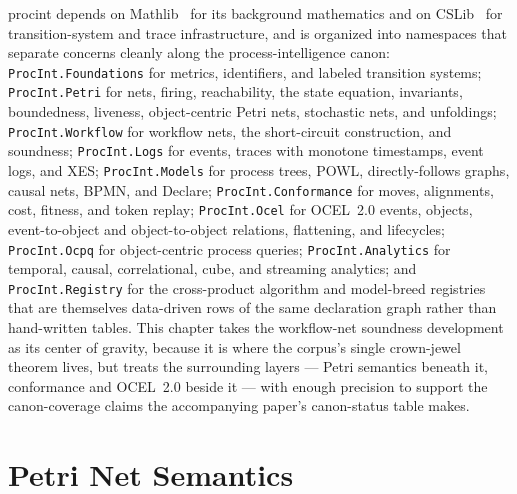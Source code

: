 \textsf{procint} depends on Mathlib~\cite{mathlib2020} for its background
mathematics and on CSLib~\cite{cslib2026} for transition-system and trace
infrastructure, and is organized into namespaces that separate concerns
cleanly along the process-intelligence canon: \texttt{ProcInt.Foundations}
for metrics, identifiers, and labeled transition systems;
\texttt{ProcInt.Petri} for nets, firing, reachability, the state
equation, invariants, boundedness, liveness, object-centric Petri nets,
stochastic nets, and unfoldings; \texttt{ProcInt.Workflow} for workflow
nets, the short-circuit construction, and soundness; \texttt{ProcInt.Logs}
for events, traces with monotone timestamps, event logs, and XES;
\texttt{ProcInt.Models} for process trees, POWL, directly-follows graphs,
causal nets, BPMN, and Declare; \texttt{ProcInt.Conformance} for moves,
alignments, cost, fitness, and token replay; \texttt{ProcInt.Ocel} for
OCEL~2.0 events, objects, event-to-object and object-to-object relations,
flattening, and lifecycles; \texttt{ProcInt.Ocpq} for object-centric
process queries; \texttt{ProcInt.Analytics} for temporal, causal,
correlational, cube, and streaming analytics; and \texttt{ProcInt.Registry}
for the cross-product algorithm and model-breed registries that are
themselves data-driven rows of the same declaration graph rather than
hand-written tables. This chapter takes the workflow-net soundness
development as its center of gravity, because it is where the corpus's
single crown-jewel theorem lives, but treats the surrounding layers ---
Petri semantics beneath it, conformance and OCEL~2.0 beside it --- with
enough precision to support the canon-coverage claims the accompanying
paper's canon-status table makes.

\section{Petri Net Semantics}
\label{sec:procint-petri}

